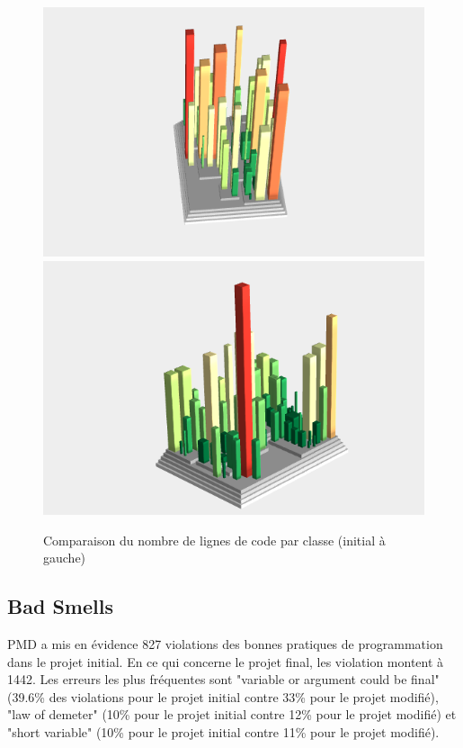 \documentclass[a4paper,12pt]{report} %
\begin{document}
\begin{figure}[!h]
\includegraphics[scale=0.5]{ressources/final_initial_lines_of_code}\includegraphics[scale=0.5]{ressources/final_new_lines_of_code}\caption{Comparaison du nombre de lignes de code par classe (initial à gauche)}


\end{figure}

\subsection{Bad Smells}
PMD a mis en évidence 827 violations des bonnes pratiques de programmation
dans le projet initial. En ce qui concerne le projet final, les violation montent à 1442. Les erreurs les plus fréquentes sont "variable
or argument could be final" (39.6\% des violations pour le projet
initial contre 33\% pour le projet modifié), "law of demeter"
(10\% pour le projet initial contre 12\% pour le projet modifié) et
"short variable" (10\% pour le projet initial contre 11\% pour
le projet modifié).
\end{document}
